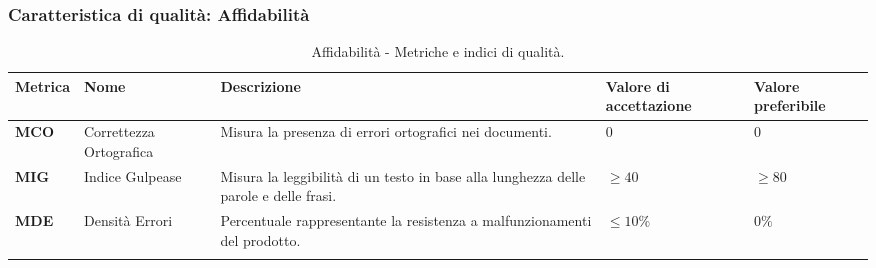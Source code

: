 \subsubsection{Caratteristica di qualità: Affidabilità}
\hspace{1pt}
    \begin{longtable}{|C{1.5cm}|L{3cm}|L{4cm}|L{2.5cm}|L{2.5cm}|}
            \hline
            \textbf{Metrica} & \textbf{Nome} & \textbf{Descrizione} & \textbf{Valore di accettazione} & \textbf{Valore preferibile} \\
            \hline
             \textbf{MCO} & Correttezza Ortografica & Misura la presenza di errori ortografici nei documenti. & $0$ & $0$ \\
            \hline
            \textbf{MIG} & Indice Gulpease & Misura la leggibilità di un testo in base alla lunghezza delle parole e delle frasi. & $\geq 40$ & $\geq 80$ \\
            \hline
            \textbf{MDE} & Densità Errori & Percentuale rappresentante la resistenza a malfunzionamenti del prodotto.  & $\leq 10\%$ & $ 0\%$ \\
            \hline
            \caption{Affidabilità - Metriche e indici di qualità.}
        \label{tab:metriche_affidabilità_testo}
    \end{longtable}

